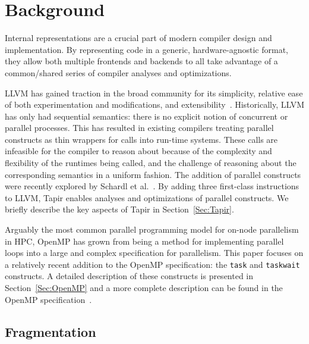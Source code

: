 \documentclass[sigconf]{acmart}
\begin{document}
\section{Background} \label{Sec:Background}

Internal representations are a crucial part of modern compiler design and implementation.  By
representing code in a generic, hardware-agnostic format, they allow both
multiple frontends and backends to all take advantage of a common/shared series of compiler
analyses and optimizations.

LLVM has gained traction in the broad community for its simplicity,
relative ease of both experimentation and modifications, and extensibility~\cite{lattner2004llvm}.
Historically, LLVM has only had sequential semantics: there is no explicit notion
of concurrent or parallel processes. This has resulted in existing compilers
treating parallel constructs as thin wrappers for calls into run-time
systems. These calls are infeasible for the compiler to reason about because of
the complexity and flexibility of the runtimes being called, and the challenge
of reasoning about the corresponding semantics in a uniform fashion. The
addition of parallel constructs were recently explored by Schardl et
al.~\cite{tapir}. By adding three first-class instructions to LLVM, Tapir
enables analyses and optimizations of parallel constructs. We briefly describe
the key aspects of Tapir in Section~\ref{Sec:Tapir}.

Arguably the most common parallel programming model for on-node parallelism
in HPC, OpenMP has grown from being a method for implementing parallel loops into a
large and complex specification for parallelism. This paper focuses on a
relatively recent addition to the OpenMP specification: the \texttt{task}
and \texttt{taskwait} constructs. A detailed description of these constructs
is presented in Section~\ref{Sec:OpenMP} and a more complete description can
be found in the OpenMP specification~\cite{openmp}.

\subsection{Fragmentation}
\end{document}
